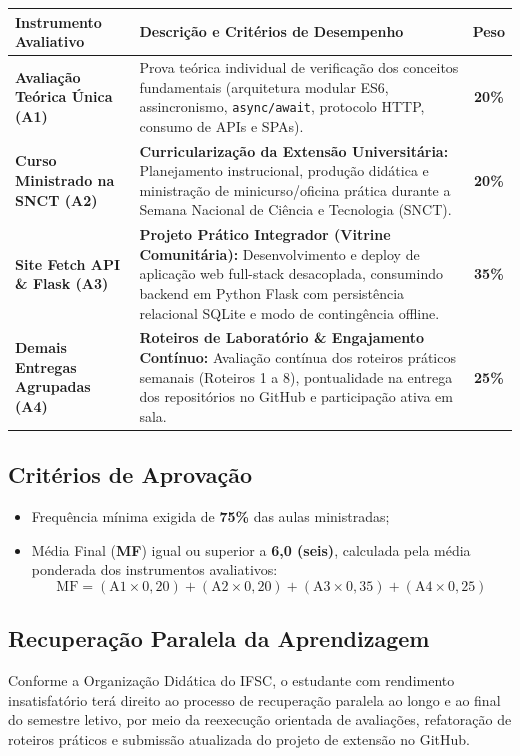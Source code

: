 \documentclass[12pt,a4paper]{article}
\begin{document}
\begin{table}[H]
\centering
\small
\begin{tabularx}{\textwidth}{|l|X|c|}
\hline
\rowcolor{cinzaCabecalho}
\textbf{Instrumento Avaliativo} & \textbf{Descrição e Critérios de Desempenho} & \textbf{Peso} \\ \hline
\textbf{Avaliação Teórica Única (A1)} & Prova teórica individual de verificação dos conceitos fundamentais (arquitetura modular ES6, assincronismo, \texttt{async/await}, protocolo HTTP, consumo de APIs e SPAs). & \textbf{20\%} \\ \hline
\rowcolor{cinzaLinha}
\textbf{Curso Ministrado na SNCT (A2)} & \textbf{Curricularização da Extensão Universitária:} Planejamento instrucional, produção didática e ministração de minicurso/oficina prática durante a Semana Nacional de Ciência e Tecnologia (SNCT). & \textbf{20\%} \\ \hline
\textbf{Site Fetch API \& Flask (A3)} & \textbf{Projeto Prático Integrador (Vitrine Comunitária):} Desenvolvimento e deploy de aplicação web full-stack desacoplada, consumindo backend em Python Flask com persistência relacional SQLite e modo de contingência offline. & \textbf{35\%} \\ \hline
\rowcolor{cinzaLinha}
\textbf{Demais Entregas Agrupadas (A4)} & \textbf{Roteiros de Laboratório \& Engajamento Contínuo:} Avaliação contínua dos roteiros práticos semanais (Roteiros 1 a 8), pontualidade na entrega dos repositórios no GitHub e participação ativa em sala. & \textbf{25\%} \\ \hline
\end{tabularx}
\end{table}

\subsection{Critérios de Aprovação}
\begin{itemize}[leftmargin=*]
    \item Frequência mínima exigida de \textbf{75\%} das aulas ministradas;
    \item Média Final (\textbf{MF}) igual ou superior a \textbf{6,0 (seis)}, calculada pela média ponderada dos instrumentos avaliativos:
    \[
    \text{MF} = (\text{A1} \times 0{,}20) + (\text{A2} \times 0{,}20) + (\text{A3} \times 0{,}35) + (\text{A4} \times 0{,}25)
    \]
\end{itemize}

\subsection{Recuperação Paralela da Aprendizagem}
Conforme a Organização Didática do IFSC, o estudante com rendimento insatisfatório terá direito ao processo de recuperação paralela ao longo e ao final do semestre letivo, por meio da reexecução orientada de avaliações, refatoração de roteiros práticos e submissão atualizada do projeto de extensão no GitHub.
\end{document}

